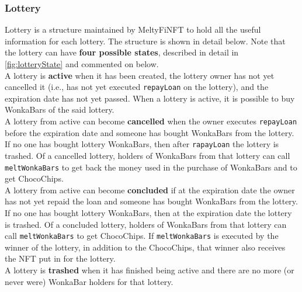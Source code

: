 \subsubsection{Lottery}
Lottery is a structure maintained by MeltyFiNFT to hold all the useful information for each lottery. The structure is shown in detail below. Note that the lottery can have \textbf{four possible states}, described in detail in \autoref{fig:lotteryState} and commented on below. 
\\
\indent A lottery is \textbf{active} when it has been created, the lottery owner has not yet cancelled it (i.e., has not yet executed \texttt{repayLoan} on the lottery), and the expiration date has not yet passed. When a lottery is active, it is possible to buy WonkaBars of the said lottery. 
\\
\indent A lottery from active can become \textbf{cancelled} when the owner executes \texttt{repayLoan} before the expiration date and someone has bought WonkaBars from the lottery. If no one has bought lottery WonkaBars, then after \texttt{rapayLoan} the lottery is trashed. Of a cancelled lottery, holders of WonkaBars from that lottery can call \texttt{meltWonkaBars} to get back the money used in the purchase of WonkaBars and to get ChocoChips.
\\
\indent A lottery from active can become \textbf{concluded} if at the expiration date the owner has not yet repaid the loan and someone has bought WonkaBars from the lottery. If no one has bought lottery WonkaBars, then at the expiration date the lottery is trashed. Of a concluded lottery, holders of WonkaBars from that lottery can call \texttt{meltWonkaBars} to get ChocoChips. If \texttt{meltWonkaBars} is executed by the winner of the lottery, in addition to the ChocoChips, that winner also receives the NFT put in for the lottery.
\\
\indent A lottery is \textbf{trashed} when it has finished being active and there are no more (or never were) WonkaBar holders for that lottery.

